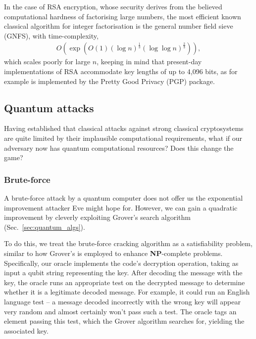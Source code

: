 In the case of RSA encryption, whose security derives from the believed computational hardness of factorising large numbers, the most efficient known classical algorithm for integer factorisation is the general number field sieve (GNFS), with time-complexity,
\begin{align} \label{eq:GNFS_scaling}
	O(\exp (O(1) (\log n)^{\frac{1}{3}} (\log\log n)^{\frac{2}{3}})),
\end{align}
which scales poorly for large $n$, keeping in mind that present-day implementations of RSA accommodate key lengths of up to 4,096 bits, as for example is implemented by the Pretty Good Privacy (PGP) package.

%
%

\subsection{Quantum attacks}

Having established that classical attacks against strong classical cryptosystems are quite limited by their implausible computational requirements, what if our adversary now has quantum computational resources? Does this change the game?

%
%

\subsubsection{Brute-force}\label{sec:brute_force_attacks}

A brute-force attack by a quantum computer does not offer us the exponential improvement attacker Eve might hope for. However, we can gain a quadratic improvement by cleverly exploiting Grover's search algorithm (Sec.~\ref{sec:quantum_algs}).

To do this, we treat the brute-force cracking algorithm as a satisfiability problem, similar to how Grover's is employed to enhance \textbf{NP}-complete problems. Specifically, our oracle implements the code's decryption operation, taking as input a qubit string representing the key. After decoding the message with the key, the oracle runs an appropriate test on the decrypted message to determine whether it is a legitimate decoded message. For example, it could run an English language test -- a message decoded incorrectly with the wrong key will appear very random and almost certainly won't pass such a test. The oracle tags an element passing this test, which the Grover algorithm searches for, yielding the associated key.

